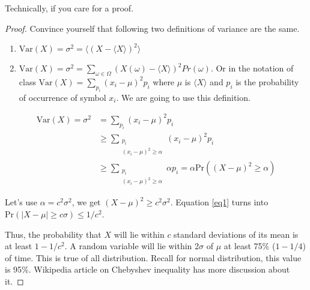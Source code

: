 \documentclass[a4paper,8pt,addpoints,solution]{exam}
\newcommand\MEAN[1]{\langle #1\rangle}
\newcommand\VAR[1]{\text{Var}(#1)}
\newcommand\PR{\text{Pr}}
\begin{document}
\begin{questions}
\begin{parts}
\begin{solution}
            Technically, if you care for a proof.
            \begin{proof}
                Convince yourself that following two definitions of variance
                are the same.
                \begin{enumerate}
                    \item $\VAR{X}=\sigma^2=\MEAN{(X-\MEAN{X})^2}$
                    \item $\VAR{X}=\sigma^2=\sum\limits_{\omega \in \Omega} (X(\omega)-\MEAN{X})^2
                        Pr(\omega)$. Or in the notation of class
                        $\VAR{X}=\sum\limits_{p_i} (x_i - \mu)^2p_i$ where $\mu$
                        is $\MEAN{X}$ and $p_i$ is the probability of occurrence
                        of symbol $x_i$. We are going to use this definition.
                \end{enumerate}

                \begin{align}
                    \VAR{X} = \sigma^2 
                        &= \sum\limits_{p_i} (x_i - \mu)^2 p_i \\
                        & \ge \sum\limits_{\substack{p_i \\ (x_i-\mu)^2 \ge \alpha}} (x_i - \mu)^2 p_i \\
                        & \ge \sum\limits_{\substack{p_i \\ (x_i-\mu)^2 \ge
                            \alpha}} \alpha p_i = \alpha \PR\left((X-\mu)^2 \ge
                        \alpha\right) \label{eq1}
                \end{align}

                Let's use $\alpha=c^2\sigma^2$, we get $(X-\mu)^2 \ge
                c^2\sigma^2$. Equation \ref{eq1} turns into 
                $\PR(|X-\mu|\ge c\sigma) \le 1/c^2$. 

                Thus, the probability that $X$ will lie within $c$ standard deviations of its mean
                is at least $1-1/c^2$. A random variable will lie within
                2$\sigma$ of $\mu$  at least 75\% ($1-1/4$) of time. This is
                true of all distribution. Recall for normal distribution, this
                value is 95\%. Wikipedia article on Chebyshev inequality has
                more discussion about it.
            \end{proof}
        \end{solution}

    \end{parts}



\end{questions}
\end{document}
